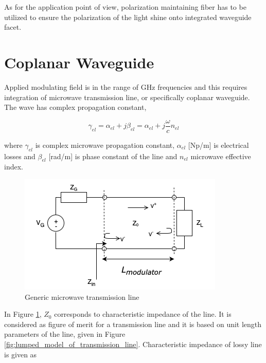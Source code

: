 \documentclass[thesis]{deutez}
\begin{document}
    
    As for the application point of view, polarization maintaining fiber has to be utilized to ensure the polarization of the light shine onto integrated waveguide facet.

    \section{Coplanar Waveguide}

    Applied modulating field is in the range of GHz frequencies and this requires integration of microwave transmission line, or specifically coplanar waveguide. The wave has complex propagation constant,

    \begin{equation}
        \gamma_{el} = \alpha_{el} + j\beta_{el} = \alpha_{el} +j \frac{\omega}{c} n_{el}
        \label{eq:mic-prop-const}
    \end{equation}

    where $\gamma_{el}$ is complex microwave propagation constant, $\alpha_{el}$ [Np/m] is electrical losses and $\beta_{el}$ [rad/m] is phase constant of the line and $n_{el}$ microwave effective index.




    \begin{figure}[h]
        \centering
        \includegraphics[width=0.5\linewidth]{TL_model.png}
        \caption{Generic microwave transmission line}
        \label{fig:transmissionline.png}
    \end{figure}

	In Figure \ref{fig:transmissionline.png}, $Z_0$ corresponds to characteristic impedance of the line. It is considered as figure of merit for a transmission line and it is based on unit length parameters of the line, given in Figure \ref{fig:lumped_model_of_transmission_line}. Characteristic impedance of lossy line is given as 
	
\end{document}
